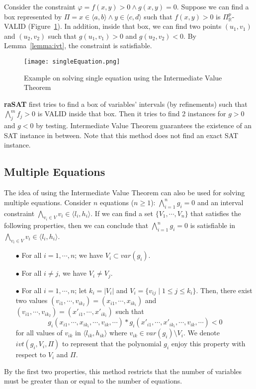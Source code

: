 \begin{example}
Consider the constraint $\varphi = f(x, y) > 0 \wedge g(x, y) = 0$. Suppose we can find a box represented by $\Pi = x \in \langle a, b \rangle \wedge y \in \langle c, d \rangle$ such that $f(x, y) > 0$ is $\Pi^p_\mathbb{R}$-VALID (Figure~\ref{fig:single-equation}). In addition, inside that box, we can find two points $(u_1, v_1)$ and $(u_2, v_2)$ such that $g(u_1, v_1) > 0$ and $g(u_2, v_2) < 0$. By Lemma~\ref{lemma:ivt}, the constraint is satisfiable.
\end{example}
\begin{figure}[ht]
\centering
\texttt{[image: singleEquation.png]} 
\caption{Example on solving single equation using the Intermediate Value Theorem} 
\label{fig:single-equation} 
\end{figure} 
{\bf raSAT} first tries to find a box of variables' intervals (by refinements) such that $\bigwedge \limits_{j}^m f_j > 0$ is VALID inside that box. Then it tries to find 2 instances for $g > 0$ and $g < 0$ by testing. 
Intermediate Value Theorem guarantees the existence of an SAT instance in between. 
Note that this method does not find an exact SAT instance. 
\subsection*{Multiple Equations}
The idea of using the Intermediate Value Theorem can also be used for solving multiple equations. Consider $n$ equations ($n \ge 1$): $\bigwedge \limits_{i=1}^n g_i = 0$ and an interval constraint ${\bigwedge\limits_{v_i \in V}v_i \in \langle l_i, h_i \rangle}$. If we can find a set ${\{V_1, \cdots, V_n\}}$ that satisfies the following properties, then we can conclude that $\bigwedge \limits_{i=1}^n g_i = 0$ is satisfiable in ${\bigwedge\limits_{v_i \in V}v_i \in \langle l_i, h_i \rangle}$.
\begin{itemize}
\item[$\bullet$] For all $i = 1, \cdots, n$; we have ${V_i \subset var(g_i)}$.
\item[$\bullet$] For all $i \neq j$, we have $V_i \neq V_j$.
\item[$\bullet$] For all $i = 1, \cdots, n$; let $k_i = |V_i|$ and $V_i = \{v_{ij} \; | \; 1 \le j \le k_i \}$. Then, there exist two values ${(v_{i1}, \cdots, v_{ik_I}) = (x_{i1}, \cdots, x_{ik_i})}$ and ${(v_{i1}, \cdots, v_{ik_I}) = (x'_{i1}, \cdots, x'_{ik_i})}$ such that \[g_i(x_{i1}, \cdots, x_{ik_i}, \cdots, v_{ik}, \cdots) * g_i(x'_{i1}, \cdots, x'_{ik_i}, \cdots, v_{ik}, \cdots) < 0\] for all values of $v_{ik}$ in $\langle l_{ik}, h_{ik} \rangle$ where $v_{ik} \in var(g_i) \setminus V_i$. We denote $ivt(g_i, V_i, \Pi)$ to represent that the polynomial $g_i$ enjoy this property with respect to $V_i$ and $\Pi$.
\end{itemize}
By the first two properties, this method restricts that the number of variables must be greater than or equal to the number of equations.

